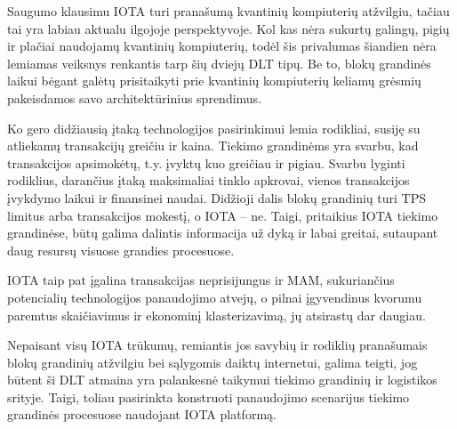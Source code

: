 Saugumo klausimu IOTA turi pranašumą kvantinių kompiuterių atžvilgiu, tačiau tai yra labiau aktualu ilgojoje perspektyvoje. Kol kas nėra sukurtų galingų, pigių ir plačiai naudojamų kvantinių kompiuterių, todėl šis privalumas šiandien nėra lemiamas veiksnys renkantis tarp šių dviejų DLT tipų. Be to, blokų grandinės laikui bėgant galėtų prisitaikyti prie kvantinių kompiuterių keliamų grėsmių pakeisdamos savo architektūrinius sprendimus.

Ko gero didžiausią įtaką technologijos pasirinkimui lemia rodikliai, susiję su atliekamų transakcijų greičiu ir kaina. Tiekimo grandinėms yra svarbu, kad transakcijos apsimokėtų, t.y. įvyktų kuo greičiau ir pigiau. Svarbu lyginti rodiklius, darančius įtaką maksimaliai tinklo apkrovai, vienos transakcijos įvykdymo laikui ir finansinei naudai. Didžioji dalis blokų grandinių turi TPS limitus arba transakcijos mokestį, o IOTA – ne. Taigi, pritaikius IOTA tiekimo grandinėse, būtų galima dalintis informacija už dyką ir labai greitai, sutaupant daug resursų visuose grandies procesuose.

IOTA taip pat įgalina transakcijas neprisijungus ir MAM, sukuriančius potencialių technologijos panaudojimo atvejų, o pilnai įgyvendinus kvorumu paremtus skaičiavimus ir ekonominį klasterizavimą, jų atsirastų dar daugiau.

Nepaisant visų IOTA trūkumų, remiantis jos savybių ir rodiklių pranašumais blokų grandinių atžvilgiu bei sąlygomis daiktų internetui, galima teigti, jog būtent ši DLT atmaina yra palankesnė taikymui tiekimo grandinių ir logistikos srityje. Taigi, toliau pasirinkta konstruoti panaudojimo scenarijus tiekimo grandinės procesuose naudojant IOTA platformą.